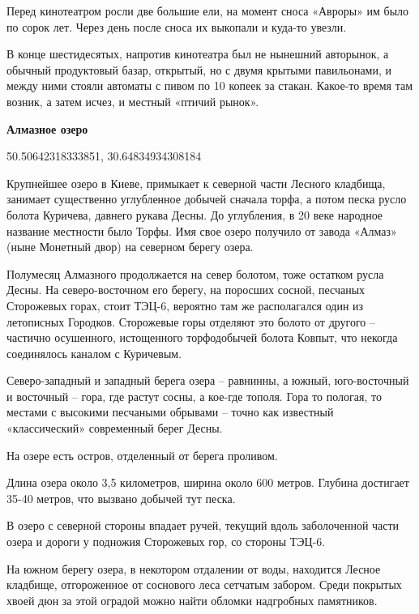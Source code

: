 Перед кинотеатром росли две большие ели, на момент сноса «Авроры» им было по сорок лет. Через день после сноса их выкопали и куда-то увезли.

В конце шестидесятых, напротив кинотеатра был не нынешний авторынок, а обычный продуктовый базар, открытый, но с двумя крытыми павильонами, и между ними стояли автоматы с пивом по 10 копеек за стакан. Какое-то время там возник, а затем исчез, и местный «птичий рынок».\\

\medskip

\textbf{Алмазное озеро}

50.50642318333851, 30.64834934308184

Крупнейшее озеро в Киеве, примыкает к северной части Лесного кладбища, занимает существенно углубленное добычей сначала торфа, а потом песка русло болота Куричева, давнего рукава Десны. До углубления, в 20 веке народное название местности было Торфы. Имя свое озеро получило от завода «Алмаз» (ныне Монетный двор) на северном берегу озера.

Полумесяц Алмазного продолжается на север болотом, тоже остатком русла Десны. На северо-восточном его берегу, на поросших сосной, песчаных Сторожевых горах, стоит ТЭЦ-6, вероятно там же располагался один из летописных Городков. Сторожевые горы отделяют это болото от другого – частично осушенного, истощенного торфодобычей болота Ковпыт, что некогда соединялось каналом с Куричевым.

Северо-западный и западный берега озера – равнинны, а южный, юго-восточный и восточный – гора, где растут сосны, а кое-где тополя. Гора то пологая, то местами с высокими песчаными обрывами – точно как известный «классический» современный берег Десны. 

На озере есть остров, отделенный от берега проливом.

Длина озера около 3,5 километров, ширина около 600 метров. Глубина достигает 35-40 метров, что вызвано добычей тут песка.

В озеро с северной стороны впадает ручей, текущий вдоль заболоченной части озера и дороги у подножия Сторожевых гор, со стороны ТЭЦ-6.

На южном берегу озера, в некотором отдалении от воды, находится Лесное кладбище, отгороженное от соснового леса сетчатым забором. Среди покрытых хвоей дюн за этой оградой можно найти обломки надгробных памятников.\\

\medskip

